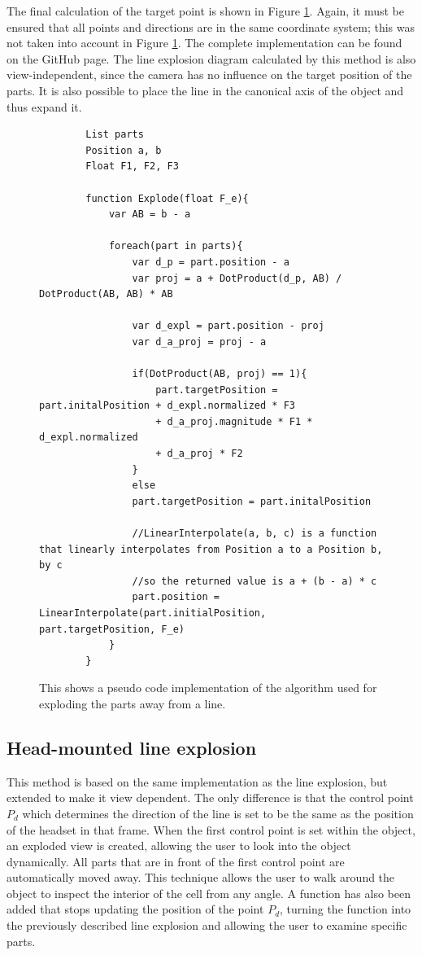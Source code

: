 The final calculation of the target point is shown in Figure \ref{fig:LineexplosionCode}.
Again, it must be ensured that all points and directions are in the same coordinate system; this was not taken into account in Figure \ref{fig:LineexplosionCode}. The complete implementation can be found on the GitHub page. %
The line explosion diagram calculated by this method is also view-independent, since the camera has no influence on the target position of the parts.  
It is also possible to place the line in the canonical axis of the object and thus expand it.  
\begin{figure}[ht]
	\begin{lstlisting}
		List parts
		Position a, b
		Float F1, F2, F3
		
		function Explode(float F_e){
			var AB = b - a
			
			foreach(part in parts){
				var d_p = part.position - a
				var proj = a + DotProduct(d_p, AB) / DotProduct(AB, AB) * AB
				
				var d_expl = part.position - proj
				var d_a_proj = proj - a
				
				if(DotProduct(AB, proj) == 1){
					part.targetPosition = part.initalPosition + d_expl.normalized * F3
					+ d_a_proj.magnitude * F1 * d_expl.normalized
					+ d_a_proj * F2
				}
				else
				part.targetPosition = part.initalPosition
				
				//LinearInterpolate(a, b, c) is a function that linearly interpolates from Position a to a Position b, by c
				//so the returned value is a + (b - a) * c
				part.position = LinearInterpolate(part.initialPosition, part.targetPosition, F_e)
			}
		}
	\end{lstlisting}
	\caption{This shows a pseudo code implementation of the algorithm used for exploding the parts away from a line.}
	\label{fig:LineexplosionCode}
\end{figure}
\subsection{Head-mounted line explosion}
This method is based on the same implementation as the line explosion, but extended to make it view dependent. 
The only difference is that the control point $P_d$ which determines the direction of the line is set to be the same as the position of the headset in that frame. 
When the first control point is set within the object, an exploded view is created, allowing the user to look into the object dynamically. 
All parts that are in front of the first control point are automatically moved away. 
This technique allows the user to walk around the object to inspect the interior of the cell from any angle.
A function has also been added that stops updating the position of the point $P_d$, turning the function into the previously described line explosion and allowing the user to examine specific parts. 

